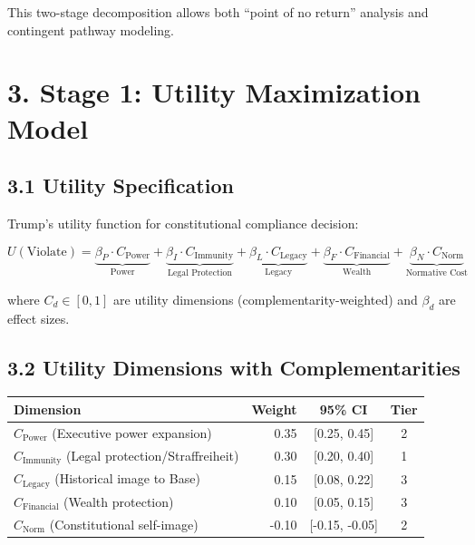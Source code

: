 \documentclass[11pt]{article}
\begin{document}
This two-stage decomposition allows both ``point of no return'' analysis and contingent pathway modeling.

\section{3. Stage 1: Utility Maximization Model}

\subsection{3.1 Utility Specification}

Trump's utility function for constitutional compliance decision:

\begin{equation}
U(\text{Violate}) = \underbrace{\beta_P \cdot C_{\text{Power}}}_{\text{Power}} + \underbrace{\beta_I \cdot C_{\text{Immunity}}}_{\text{Legal Protection}} + \underbrace{\beta_L \cdot C_{\text{Legacy}}}_{\text{Legacy}} + \underbrace{\beta_F \cdot C_{\text{Financial}}}_{\text{Wealth}} + \underbrace{\beta_N \cdot C_{\text{Norm}}}_{\text{Normative Cost}}
\end{equation}

where $C_d \in [0,1]$ are utility dimensions (complementarity-weighted) and $\beta_d$ are effect sizes.

\subsection{3.2 Utility Dimensions with Complementarities}

\begin{table}[h]
\centering
\begin{tabular}{|l|r|c|c|}
\hline
\textbf{Dimension} & \textbf{Weight} & \textbf{95\% CI} & \textbf{Tier} \\
\hline
$C_{\text{Power}}$ (Executive power expansion) & 0.35 & [0.25, 0.45] & 2 \\
$C_{\text{Immunity}}$ (Legal protection/Straffreiheit) & 0.30 & [0.20, 0.40] & 1 \\
$C_{\text{Legacy}}$ (Historical image to Base) & 0.15 & [0.08, 0.22] & 3 \\
$C_{\text{Financial}}$ (Wealth protection) & 0.10 & [0.05, 0.15] & 3 \\
$C_{\text{Norm}}$ (Constitutional self-image) & -0.10 & [-0.15, -0.05] & 2 \\
\hline
\end{tabular}
\end{table}
\end{document}
